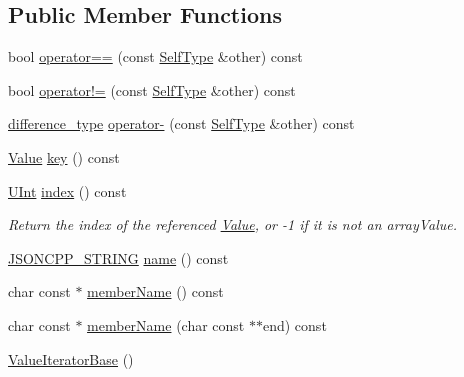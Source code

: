 \subsection*{Public Member Functions}
\begin{DoxyCompactItemize}
\item 
bool \hyperlink{class_json_1_1_value_iterator_base_a1248d8016f88b51371a0fcbd355b3cfd}{operator==} (const \hyperlink{class_json_1_1_value_iterator_base_a9d2a940d03ea06d20d972f41a89149ee}{Self\+Type} \&other) const
\item 
bool \hyperlink{class_json_1_1_value_iterator_base_aa83bdcc8114b7d040eb8eb42eeed5f4a}{operator!=} (const \hyperlink{class_json_1_1_value_iterator_base_a9d2a940d03ea06d20d972f41a89149ee}{Self\+Type} \&other) const
\item 
\hyperlink{class_json_1_1_value_iterator_base_a4e44bf8cbd17ec8d6e2c185904a15ebd}{difference\+\_\+type} \hyperlink{class_json_1_1_value_iterator_base_a98e254263fca5f1fc8fcac7bcb0260bf}{operator-\/} (const \hyperlink{class_json_1_1_value_iterator_base_a9d2a940d03ea06d20d972f41a89149ee}{Self\+Type} \&other) const
\item 
\hyperlink{class_json_1_1_value}{Value} \hyperlink{class_json_1_1_value_iterator_base_a3838ba39c43c518cf3ed4aa6ce78ccad}{key} () const
\item 
\hyperlink{namespace_json_a800fb90eb6ee8d5d62b600c06f87f7d4}{U\+Int} \hyperlink{class_json_1_1_value_iterator_base_a549c66a0bd20e9ae772175a5c0d2e88a}{index} () const
\begin{DoxyCompactList}\small\item\em Return the index of the referenced \hyperlink{class_json_1_1_value}{Value}, or -\/1 if it is not an array\+Value. \end{DoxyCompactList}\item 
\hyperlink{config_8h_a1e723f95759de062585bc4a8fd3fa4be}{J\+S\+O\+N\+C\+P\+P\+\_\+\+S\+T\+R\+I\+NG} \hyperlink{class_json_1_1_value_iterator_base_a522989403c976fdbb94da846b99418db}{name} () const
\item 
char const  $\ast$ \hyperlink{class_json_1_1_value_iterator_base_a54765da6759fd3f1edcbfbaf308ec263}{member\+Name} () const
\item 
char const  $\ast$ \hyperlink{class_json_1_1_value_iterator_base_a391c9cbd0edf9a447b37df00e8ce6059}{member\+Name} (char const $\ast$$\ast$end) const
\item 
\hyperlink{class_json_1_1_value_iterator_base_af45b028d9ff9cbd2554a87878b42dd75}{Value\+Iterator\+Base} ()
\item 
$$
\end{DoxyCompactItemize}
